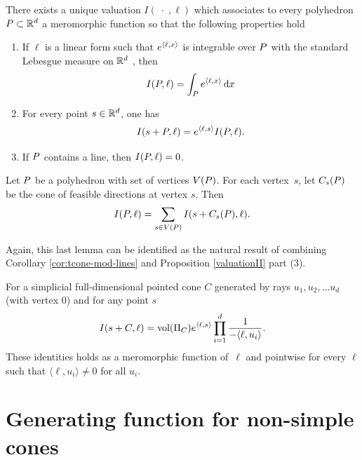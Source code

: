 \begin{proposition}\label{valuationII}
There exists a unique valuation  $I(\;\cdot\;, \ell)$ which  associates  to every polyhedron
${ P}\subset {\mathbb R}^d$ a meromorphic function so that the following properties hold 

\begin{enumerate}
\item If $\ell$ is a linear form such that $e^{{\langle} \ell, x {\rangle}}$ is integrable over ${ P}$ with the standard Lebesgue measure on ${\mathbb R}^d$ , then 
\[ I({ P},\ell) = \int_{ P} e^{{\langle} \ell, x {\rangle}} \,\mathrm{d} x\]
\item For every point $s \in {\mathbb R}^d$, one has
\[I(s+{ P}, \ell) = e^{{\langle} \ell, s {\rangle}}I({ P},\ell).\]
\item If ${ P}$ contains a line, then $I({ P}, \ell) = 0$.
\end{enumerate}
\end{proposition}


\begin{lemma}  Let ${ P}$ be a polyhedron with set of vertices $V({ P})$. For each
vertex~$s$, let $C_s({ P})$ be the cone of feasible directions at vertex $s$. Then
\begin{equation*}
I({ P},\ell)=\sum_{s\in V({ P})}I(s+C_s({ P}),\ell).
\end{equation*}
\end{lemma}

Again, this last lemma can be identified as the natural result of combining Corollary \ref{cor:tcone-mod-lines} and Proposition \ref{valuationII} part (3).

\begin{proposition} 
  
  For a simplicial full-dimensional pointed cone $C$ generated by rays $u_1,u_2,\dots u_d$ (with vertex $0$) and for any point $s$
\begin{equation*}
I(s+C,\ell) = \text{vol} (\Pi_C)e^{{\langle} \ell, s {\rangle}} \prod_{i=1}^d \frac{1}{-{\langle} \ell, u_i {\rangle}}.
\end{equation*}
These identities holds as a meromorphic function of~$\ell$ 
and pointwise for every $\ell$ such that $\langle \ell, u_i \rangle \neq 0$ for
all $u_i$.
\end{proposition}

\section{Generating function for non-simple cones}

